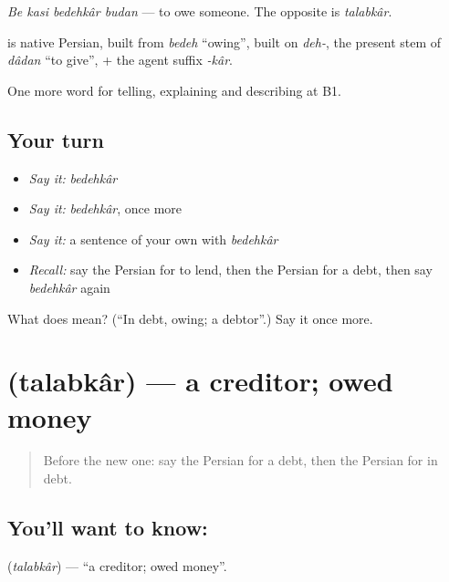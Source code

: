 \emph{Be kasi bedehkâr budan} — to owe someone. The opposite is \emph{talabkâr}.

\begin{cousinweb}
\textbf{} is native Persian, built from \emph{bedeh} \textquotedblleft{}owing\textquotedblright{}, built on \emph{deh-}, the present stem of \emph{dâdan} \textquotedblleft{}to give\textquotedblright{}, + the agent suffix \emph{-kâr}.
\end{cousinweb}

\begin{grammarlens}[title={What you've built}]
One more word for telling, explaining and describing at B1.
\end{grammarlens}

\subsection*{Your turn}
\begin{itemize}
\raggedright
  \item \emph{Say it:} \emph{bedehkâr}
  \item \emph{Say it:} \emph{bedehkâr}, once more
  \item \emph{Say it:} a sentence of your own with \emph{bedehkâr}
  \item \emph{Recall:} say the Persian for to lend, then the Persian for a debt, then say \emph{bedehkâr} again
\end{itemize}

\begin{tcolorbox}[breakable,colback=teal!4,colframe=teal!35!black,title={Before you move on}]
What does  mean? (\textquotedblleft{}In debt, owing; a debtor\textquotedblright{}.) Say it once more.
\end{tcolorbox}
\section[\texorpdfstring{\fa{طلبکار} (talabkâr)}{طلبکار (talabkâr)}]{ (talabkâr) — a creditor; owed money}

\label{lesson:FA-C411-talabkar}



\begin{quote}
Before the new one: say the Persian for a debt, then the Persian for in debt.
\end{quote}

\subsection*{You'll want to know: }
\textbf{} (\emph{talabkâr}) — \textquotedblleft{}a creditor; owed money\textquotedblright{}.

